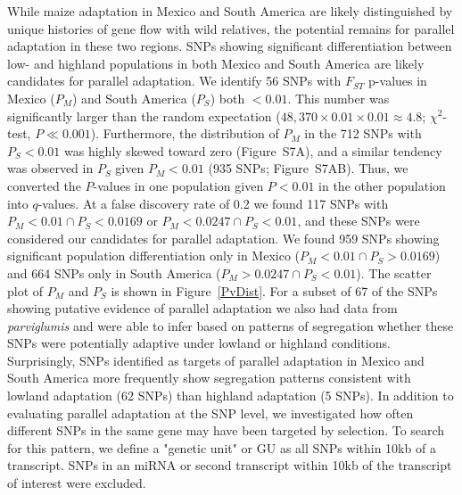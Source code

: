 {{While maize adaptation in Mexico and South America are likely distinguished by unique histories of gene flow with wild relatives, the potential remains for parallel adaptation in these two regions.  
SNPs showing significant differentiation between low- and highland populations in both Mexico and South America are likely candidates for parallel adaptation. 
We identify 56 SNPs with $F_{ST}$ p-values in Mexico ($P_M$) and South America ($P_S$) both $<0.01$.   
This number  was significantly larger than the random expectation ($48,370\times 0.01 \times 0.01 \approx 4.8$; $\chi^2$-test, $P\ll0.001$).  Furthermore, the distribution of $P_M$ in the 712 SNPs with $P_S<0.01$ was highly skewed toward zero (Figure~S7A), and a similar tendency was observed in $P_S$ given $P_M<0.01$ (935 SNPs; Figure~S7AB).  Thus, we converted the $P$-values in one population given $P<0.01$ in the other population into $q$-values.  
At a false discovery rate of 0.2 we found 117 SNPs with $P_M<0.01 \cap P_S < 0.0169$ or $P_M<0.0247 \cap P_S < 0.01$, and these SNPs were considered our candidates for parallel adaptation.
We found 959 SNPs showing significant population differentiation only in Mexico ($P_M<0.01 \cap P_S > 0.0169$) and 664 SNPs only in South America  ($P_M>0.0247 \cap P_S < 0.01$).  The scatter plot of $P_M$ and $P_S$ is shown in Figure~\ref{PvDist}.  
For a subset of 67 of the SNPs showing putative evidence of parallel adaptation we also had data from \textit{parviglumis} and were able to infer based on patterns of segregation whether these SNPs were potentially adaptive under lowland or highland conditions.  Surprisingly, SNPs identified as targets of parallel adaptation in Mexico and South America more frequently show segregation patterns consistent with lowland adaptation (62 SNPs) than highland adaptation (5 SNPs). 
%
%
%
In addition to evaluating parallel adaptation at the SNP level, we investigated how often different SNPs in the same gene may have been targeted by selection. To search for this pattern, we define a "genetic unit" or GU as all SNPs within 10kb of a transcript.  SNPs in an miRNA or second transcript within 10kb of the transcript of interest were excluded.  
}}
